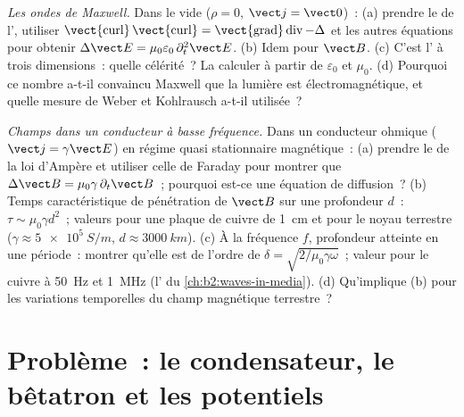 \begin{exercise}[$\star\star\star$]\label{exo:b2:maxwell-equations:11}
\emph{Les ondes de Maxwell.} Dans le vide ($\rho = 0$, $\vect j = \vect 0$)~: (a) prendre
le  de l', utiliser $\operatorname{\vect{curl}}
\operatorname{\vect{curl}} = \operatorname{\vect{grad}}\operatorname{div} - \Delta$ et les autres
équations pour obtenir $\Delta\vect E = \mu_0\varepsilon_0\,\partial_t^2\vect E$. (b) Idem pour
$\vect B$. (c) C'est l' à trois dimensions~: quelle célérité~?
La calculer à partir de $\varepsilon_0$ et $\mu_0$. (d) Pourquoi ce nombre a-t-il convaincu
Maxwell que la lumière est électromagnétique, et quelle mesure de
Weber et Kohlrausch a-t-il utilisée~?
\end{exercise}

\begin{exercise}[$\star\star\star$]\label{exo:b2:maxwell-equations:12}
\emph{Champs dans un conducteur à basse fréquence.} Dans un conducteur ohmique
($\vect j = \gamma\vect E$) en régime quasi stationnaire magnétique~: (a) prendre
le  de la loi d'Ampère et utiliser celle de Faraday pour montrer que $\Delta\vect B = \mu_0\gamma\,
\partial_t\vect B$~; pourquoi est-ce une équation de diffusion~? (b) Temps caractéristique
de pénétration de $\vect B$ sur une profondeur $d$~: $\tau \sim \mu_0\gamma d^2$~; valeurs pour une
plaque de cuivre de \qty{1}{cm} et pour le noyau terrestre ($\gamma \approx \qty{5e5}{S/m}$,
$d \approx \qty{3000}{km}$). (c) À la fréquence $f$, profondeur atteinte en une
période~: montrer qu'elle est de l'ordre de $\delta = \sqrt{2/\mu_0\gamma\omega}$~; valeur pour le cuivre
à \qty{50}{Hz} et \qty{1}{MHz} (l' du
\cref{ch:b2:waves-in-media}). (d) Qu'implique (b) pour les variations
temporelles du champ magnétique terrestre~?
\end{exercise}

\section{Problème~: le condensateur, le bêtatron et les potentiels}

